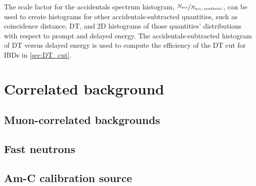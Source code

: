 The scale factor for the accidentals spectrum histogram,
$\nicefrac{N_{\text{acc}}}{N_{\text{acc,\,synthetic}}}$,
can be used to create histograms for other accidentals-subtracted quantities,
such as coincidence distance, DT, and 2D histograms of
those quantities' distributions with respect to prompt and delayed energy.
The accidentals-subtracted histogram of DT versus delayed energy
is used to compute the efficiency of the DT cut for IBDs in \cref{sec:DT_cut}.

\section{Correlated background}

\subsection{Muon-correlated backgrounds}
\label{subsec:li9}

\subsection{Fast neutrons}
\label{subsec:fastn}

\subsection{Am-C calibration source}
